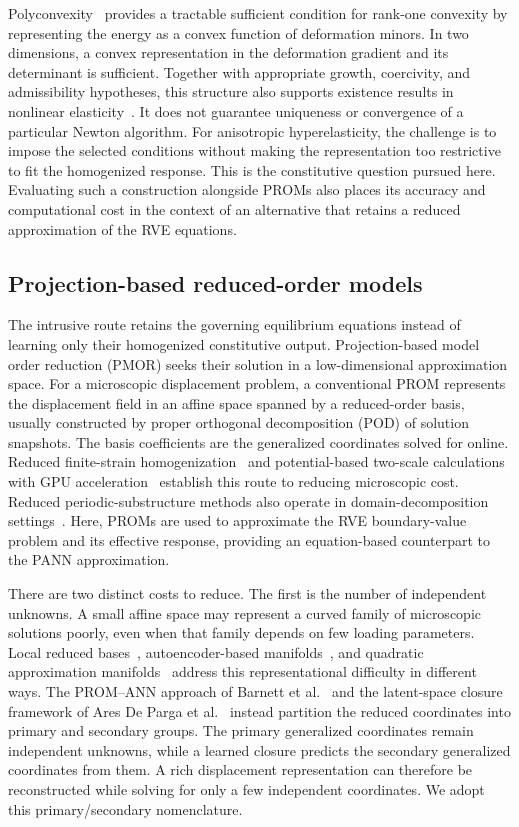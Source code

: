 Polyconvexity~\cite{ball1977} provides a tractable sufficient condition for rank-one convexity by representing the energy as a convex function of deformation minors. In two dimensions, a convex representation in the deformation gradient and its determinant is sufficient. Together with appropriate growth, coercivity, and admissibility hypotheses, this structure also supports existence results in nonlinear elasticity~\cite{Ciarlet1988}. It does not guarantee uniqueness or convergence of a particular Newton algorithm. For anisotropic hyperelasticity, the challenge is to impose the selected conditions without making the representation too restrictive to fit the homogenized response. This is the constitutive question pursued here. Evaluating such a construction alongside PROMs also places its accuracy and computational cost in the context of an alternative that retains a reduced approximation of the RVE equations.

\subsection{Projection-based reduced-order models}
The intrusive route retains the governing equilibrium equations instead of learning only their homogenized constitutive output. Projection-based model order reduction (PMOR) seeks their solution in a low-dimensional approximation space. For a microscopic displacement problem, a conventional PROM represents the displacement field in an affine space spanned by a reduced-order basis, usually constructed by proper orthogonal decomposition (POD) of solution snapshots. The basis coefficients are the generalized coordinates solved for online. Reduced finite-strain homogenization~\cite{yvonnet2007,Hernandez2014} and potential-based two-scale calculations with GPU acceleration~\cite{Fritzen2016} establish this route to reducing microscopic cost. Reduced periodic-substructure methods also operate in domain-decomposition settings~\cite{Hernandez2020}. Here, PROMs are used to approximate the RVE boundary-value problem and its effective response, providing an equation-based counterpart to the PANN approximation.

There are two distinct costs to reduce. The first is the number of independent unknowns. A small affine space may represent a curved family of microscopic solutions poorly, even when that family depends on few loading parameters. Local reduced bases~\cite{Amsallem2012}, autoencoder-based manifolds~\cite{Lee2020}, and quadratic approximation manifolds~\cite{Barnett2022} address this representational difficulty in different ways. The PROM--ANN approach of Barnett et al.~\cite{barnett2023} and the latent-space closure framework of Ares De Parga et al.~\cite{aresdeparga2026nonlinear} instead partition the reduced coordinates into primary and secondary groups. The primary generalized coordinates remain independent unknowns, while a learned closure predicts the secondary generalized coordinates from them. A rich displacement representation can therefore be reconstructed while solving for only a few independent coordinates. We adopt this primary/secondary nomenclature.


